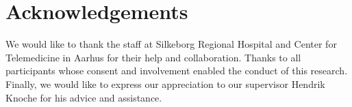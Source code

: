 \section{Acknowledgements}
We would like to thank the staff at Silkeborg Regional Hospital and Center for Telemedicine in Aarhus for their help and collaboration. Thanks to all participants whose consent and involvement enabled the conduct of this research. Finally, we  would  like  to  express  our appreciation to our supervisor Hendrik Knoche for his advice and assistance.